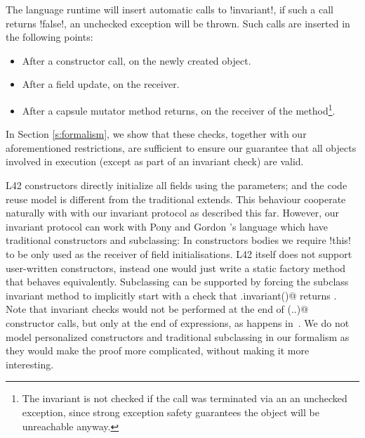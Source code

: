 



The language runtime will insert automatic calls to \Q!invariant!, if such a call returns \Q!false!, an unchecked exception will be thrown. Such calls are inserted in the following points:
\SSI\begin{itemize}
	\item After a constructor call, on the newly created object.
	\item After a field update, on the receiver.
	\item After a capsule mutator method returns, on the receiver of the method\footnote{The invariant is not checked if the call was terminated via an an unchecked exception, since strong exception safety guarantees the object will be unreachable anyway.}.
\end{itemize}
\noindent In Section \ref{s:formalism}, we show that these checks, together with our aforementioned restrictions, are sufficient to ensure our guarantee that all objects involved in execution (except as part of an invariant check) are valid.

L42 constructors directly initialize all fields using the parameters; and the code reuse model is different from the traditional extends.
This behaviour cooperate naturally with with our invariant protocol as described this far.
However, our invariant protocol can work with Pony and Gordon \etal's language which have traditional constructors and subclassing:
In constructors bodies we require \Q!this! to be only used as the receiver of field initialisations. L42 itself does not support user-written constructors, instead one would just write a static factory method that behaves equivalently.
Subclassing can be supported by forcing the subclass invariant method to implicitly start with a check that \Q@super.invariant()@ returns \Q@true@. Note that invariant checks would not be performed at the end of \Q@super(..)@ constructor calls, but only at the end of \Q@new@ expressions, as happens in~\cite{feldman2006jose}.
We do not model personalized constructors and traditional subclassing in our formalism as they would make the proof more complicated, without making it more interesting.